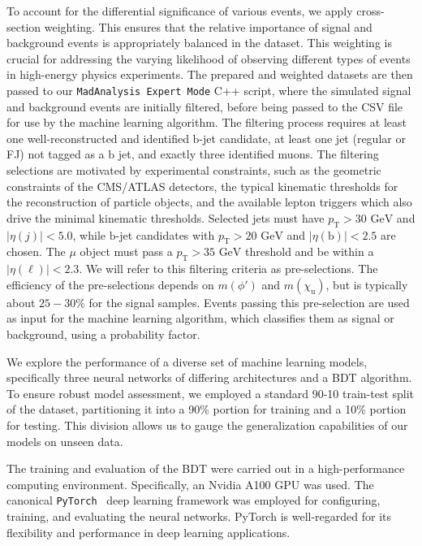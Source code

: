 To account for the differential significance of various events, we apply cross-section weighting. This ensures that the relative importance of signal and background events is appropriately balanced in the dataset. This weighting is crucial for addressing the varying likelihood of observing different types of events in high-energy physics experiments. The prepared and weighted datasets are then passed to our \texttt{MadAnalysis Expert Mode} C++ script, where the simulated signal and background events are initially filtered, before being passed to the CSV file for use by the machine learning algorithm. The filtering process requires at least one well-reconstructed and identified $\mathrm{b}$-jet candidate, at least one jet (regular or FJ) not tagged as a $\mathrm{b}$ jet, and exactly three identified muons. The filtering selections are motivated by experimental constraints, such as the geometric constraints of the CMS/ATLAS detectors, the typical kinematic thresholds for the reconstruction of particle objects, and the available lepton triggers which also drive the minimal kinematic thresholds. Selected jets must have $p_{\mathrm{T}} > 30$ $\textrm{GeV}$ and $|\eta(j)| < 5.0$, while $\mathrm{b}$-jet candidates with $p_{\mathrm{T}} > 20$ $\textrm{GeV}$ and $|\eta(\mathrm{b})| < 2.5$ are chosen. The $\mu$ object must pass a $p_{\mathrm{T}} > 35$ $\textrm{GeV}$ threshold and be within a $|\eta(\ell)| < 2.3$. We will refer to this filtering criteria as pre-selections. The efficiency of the pre-selections depends on $m(\phi')$ and $m(\chi_{\mathrm{u}})$, but is typically about $25-30$\% for the signal samples. Events passing this pre-selection are used as input for the machine learning algorithm, which classifies them as signal or background, using a probability factor. 



We explore the performance of a diverse set of machine learning models, specifically three neural networks of differing architectures and a BDT algorithm. To ensure robust model assessment, we employed a standard 90-10 train-test split of the dataset, partitioning it into a 90\% portion for training and a 10\% portion for testing. This division allows us to gauge the generalization capabilities of our models on unseen data.  

The training and evaluation of the BDT were carried out in a high-performance computing environment. Specifically, an Nvidia A100 GPU was used. The canonical \texttt{PyTorch}~\parencite{paszke2019} deep learning framework was employed for configuring, training, and evaluating the neural networks. PyTorch is well-regarded for its flexibility and performance in deep learning applications.

